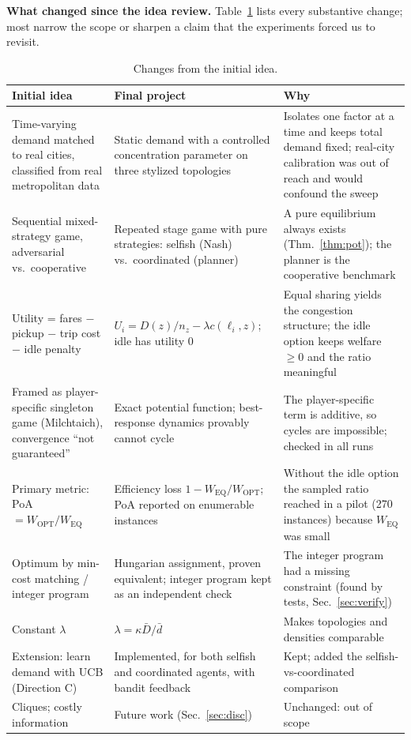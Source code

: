 \documentclass[11pt]{article}
\newcommand{\Wopt}{W_{\mathrm{OPT}}}\newcommand{\Weq}{W_{\mathrm{EQ}}}
\begin{document}
\textbf{What changed since the idea review.} Table~\ref{tab:changes} lists every substantive change; most narrow the scope or sharpen a claim that the experiments forced us to revisit.
\begin{table}[!ht]\centering\footnotesize
\begin{tabular}{p{3.1cm}p{4.5cm}p{7.3cm}}\toprule
\textbf{Initial idea} & \textbf{Final project} & \textbf{Why}\\\midrule
Time-varying demand matched to real cities, classified from real metropolitan data & Static demand with a controlled concentration parameter on three stylized topologies & Isolates one factor at a time and keeps total demand fixed; real-city calibration was out of reach and would confound the sweep\\
Sequential mixed-strategy game, adversarial vs.\ cooperative & Repeated stage game with pure strategies: selfish (Nash) vs.\ coordinated (planner) & A pure equilibrium always exists (Thm.~\ref{thm:pot}); the planner is the cooperative benchmark\\
Utility = fares $-$ pickup $-$ trip cost $-$ idle penalty & $U_i=D(z)/n_z-\lambda c(\ell_i,z)$; idle has utility 0 & Equal sharing yields the congestion structure; the idle option keeps welfare $\ge0$ and the ratio meaningful\\
Framed as player-specific singleton game (Milchtaich), convergence ``not guaranteed'' & Exact potential function; best-response dynamics provably cannot cycle & The player-specific term is additive, so cycles are impossible; checked in all \nRunsTotal{} runs\\
Primary metric: PoA $=\Wopt/\Weq$ & Efficiency loss $1-\Weq/\Wopt$; PoA reported on enumerable instances & Without the idle option the sampled ratio reached \pilotMax{} in a pilot (270 instances) because $\Weq$ was small\\
Optimum by min-cost matching / integer program & Hungarian assignment, proven equivalent; integer program kept as an independent check & The integer program had a missing constraint (found by tests, Sec.~\ref{sec:verify})\\
Constant $\lambda$ & $\lambda=\kappa\bar D/\bar d$ & Makes topologies and densities comparable\\
Extension: learn demand with UCB (Direction C) & Implemented, for both selfish and coordinated agents, with bandit feedback & Kept; added the selfish-vs-coordinated comparison\\
Cliques; costly information & Future work (Sec.~\ref{sec:disc}) & Unchanged: out of scope\\\bottomrule
\end{tabular}
\caption{Changes from the initial idea.}\label{tab:changes}\end{table}
\end{document}
